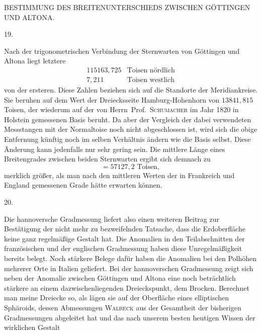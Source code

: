 \clearpage
\noindent{}\parbox[t]{\dimexpr\textwidth-10mm\relax}{\centering\scriptsize BESTIMMUNG DES BREITENUNTERSCHIEDS ZWISCHEN GÖTTINGEN UND ALTONA.}\par
\begin{center}19.\end{center}
Nach der trigonometrischen Verbindung der Sternwarten von Göttingen und Altona liegt letztere
\[
\begin{array}{rl}
115163{,}725&\text{Toisen nördlich}\\
7{,}211&\text{Toisen westlich}
\end{array}
\]
von der ersteren. Diese Zahlen beziehen sich auf die Standorte der Meridiankreise. Sie beruhen auf dem Wert der Dreiecksseite Hamburg-Hohenhorn von $13841{,}815$ Toisen, der wiederum auf der von Herrn\ Prof.\ \textsc{Schumacher} im Jahr 1820 in Holstein gemessenen Basis beruht. Da aber der Vergleich der dabei verwendeten Messstangen mit der Normaltoise noch nicht  abgeschlossen ist, wird sich die obige Entfernung künftig noch im selben Verhältnis ändern wie die Basis selbst. Diese Änderung kann jedenfalls nur sehr gering sein. Die mittlere Länge eines Breitengrades zwischen beiden Sternwarten ergibt sich demnach zu
\[
=57127{,}2\text{ Toisen},
\]
merklich größer, als man nach den mittleren Werten der in Frankreich und England gemessenen Grade hätte erwarten können.
\begin{center}20.\end{center}
Die hannoversche Gradmessung liefert also einen weiteren Beitrag zur Bestätigung der nicht mehr zu bezweifelnden Tatsache, dass die Erdoberfläche keine ganz regelmäßige Gestalt hat. Die Anomalien in den Teilabschnitten der französischen und der englischen Gradmessung haben diese Unregelmäßigkeit bereits belegt. Noch stärkere Belege dafür haben die Anomalien bei den Polhöhen mehrerer Orte in Italien geliefert. Bei der hannoverschen Gradmessung zeigt sich neben der Anomalie zwischen Göttingen und Altona eine noch beträchtlich stärkere an einem dazwischenliegenden Dreieckspunkt, dem Brocken. Berechnet man meine Dreiecke so, als lägen sie auf der Oberfläche eines elliptischen Sphäroids, dessen Abmessungen \textsc{Walbeck} aus der Gesamtheit der bisherigen Gradmessungen abgeleitet hat und das nach unserem besten heutigen Wissen der wirklichen Gestalt

